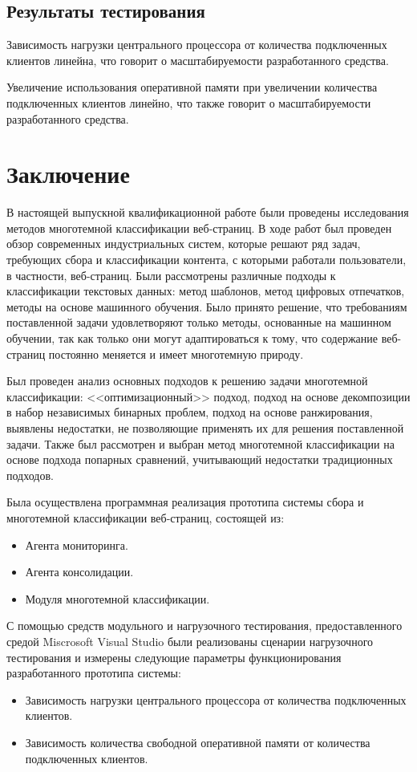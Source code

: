 \documentclass[russian, utf8, emptystyle]{eskdtext}
\begin{document}
\subsection{Результаты тестирования}

Зависимость нагрузки центрального процессора от количества подключенных клиентов линейна, что говорит о масштабируемости разработанного средства.

Увеличение использования оперативной памяти при увеличении количества подключенных клиентов  линейно, что также говорит о масштабируемости разработанного средства.
\section {Заключение}
В настоящей выпускной квалификационной работе были проведены исследования методов многотемной классификации веб-страниц. В ходе работ был проведен обзор современных индустриальных систем, которые решают ряд задач, требующих сбора и классификации контента, с которыми работали пользователи, в частности, веб-страниц. Были рассмотрены различные подходы к классификации текстовых данных: метод шаблонов, метод цифровых отпечатков, методы на основе машинного обучения. Было принято решение, что требованиям поставленной задачи удовлетворяют только методы, основанные на машинном обучении, так как только они могут адаптироваться к тому, что содержание веб-страниц постоянно меняется и имеет многотемную природу. 

Был проведен анализ основных подходов к решению задачи многотемной классификации: <<оптимизационный>> подход, подход на основе декомпозиции в набор независимых бинарных проблем, подход на основе ранжирования, выявлены недостатки, не позволяющие применять их для решения поставленной задачи. Также был рассмотрен и выбран метод многотемной классификации на основе подхода попарных сравнений, учитывающий недостатки традиционных подходов.



Была осуществлена программная реализация прототипа системы сбора и многотемной классификации веб-страниц, состоящей из:
\begin{itemize}
	\item Агента мониторинга.
	\item Агента консолидации.
	\item Модуля многотемной классификации.
\end{itemize}

С помощью средств модульного и нагрузочного тестирования, предоставленного средой Miscrosoft Visual Studio были реализованы сценарии нагрузочного тестирования и измерены следующие параметры функционирования разработанного прототипа системы:
\begin{itemize}
	\item Зависимость нагрузки центрального процессора от количества подключенных клиентов.
	\item Зависимость количества свободной оперативной памяти от количества подключенных клиентов.
\end{itemize}
\end{document}
